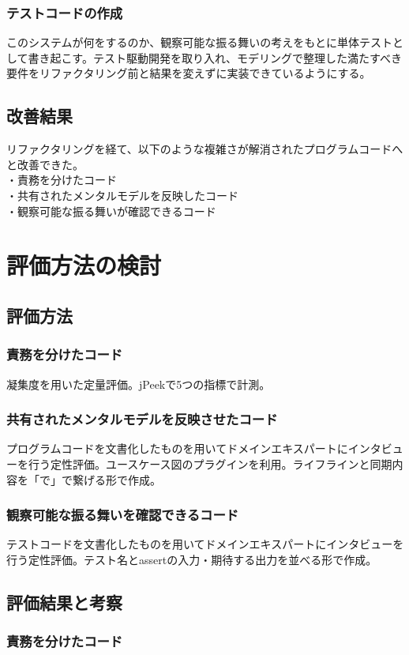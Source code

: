 \documentclass[11pt, a4paper]{jreport}
\begin{document}
\subsection{テストコードの作成}
このシステムが何をするのか、観察可能な振る舞いの考えをもとに単体テストとして書き起こす。テスト駆動開発を取り入れ、モデリングで整理した満たすべき要件をリファクタリング前と結果を変えずに実装できているようにする。
\section{改善結果}

リファクタリングを経て、以下のような複雑さが解消されたプログラムコードへと改善できた。
\\・責務を分けたコード
\\・共有されたメンタルモデルを反映したコード
\\・観察可能な振る舞いが確認できるコード

\chapter{評価方法の検討}
\section{評価方法}
\subsection{責務を分けたコード}
凝集度を用いた定量評価。jPeekで5つの指標で計測。
\subsection{共有されたメンタルモデルを反映させたコード}
プログラムコードを文書化したものを用いてドメインエキスパートにインタビューを行う定性評価。ユースケース図のプラグインを利用。ライフラインと同期内容を「で」で繋げる形で作成。
\subsection{観察可能な振る舞いを確認できるコード}
テストコードを文書化したものを用いてドメインエキスパートにインタビューを行う定性評価。テスト名とassertの入力・期待する出力を並べる形で作成。
\section{評価結果と考察}
\subsection{責務を分けたコード}
\end{document}
